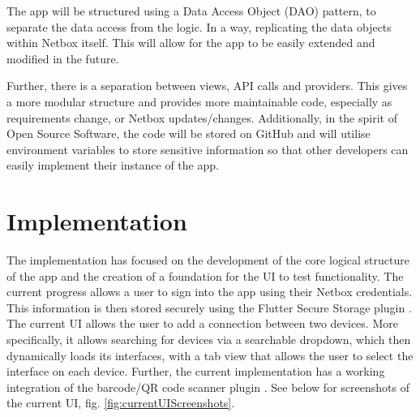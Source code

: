 \documentclass [11pt,a4paper]{article}
\begin{document}
The app will be structured using a Data Access Object (DAO) pattern\cite{dao}, to separate the data access from the logic. In a way, replicating the data objects within Netbox itself. This will allow for the app to be easily extended and modified in the future. 

Further, there is a separation between views, API calls and providers. This gives a more modular structure and provides more maintainable code, especially as requirements change, or Netbox updates/changes. Additionally, in the spirit of Open Source Software, the code will be stored on GitHub \cite{keeptrackgithub} and will utilise environment variables to store sensitive information so that other developers can easily implement their instance of the app.

\section{Implementation}
\label{sec:implementation}
The implementation has focused on the development of the core logical structure of the app and the creation of a foundation for the UI to test functionality. The current progress allows a user to sign into the app using their Netbox credentials. This information is then stored securely using the Flutter Secure Storage plugin \cite{securestorage}. The current UI allows the user to add a connection between two devices. More specifically, it allows searching for devices via a searchable dropdown, which then dynamically loads its interfaces, with a tab view that allows the user to select the interface on each device. Further, the current implementation has a working integration of the barcode/QR code scanner plugin \cite{barcodeScannerPlugin}. See below for screenshots of the current UI, fig. \ref{fig:currentUIScreenshots}. 
\end{document}
